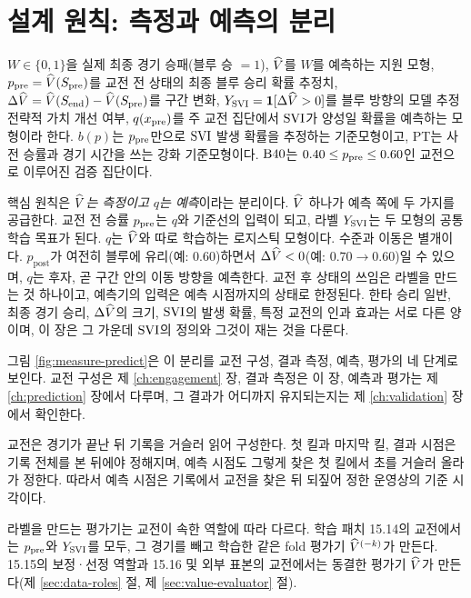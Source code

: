 \section{설계 원칙: 측정과 예측의 분리}
\label{sec:value-principle}

$W \in \{0,1\}$을 실제 최종 경기 승패(블루 승 $=1$), $\widehat V$를 $W$를 예측하는 지원 모형, $p_{\mathrm{pre}} = \widehat V(S_{\mathrm{pre}})$를 교전 전 상태의 최종 블루 승리 확률 추정치, $\Delta\widehat V = \widehat V(S_{\mathrm{end}}) - \widehat V(S_{\mathrm{pre}})$를 구간 변화, $Y_{\mathrm{SVI}} = \mathbf{1}[\Delta\widehat V > 0]$를 블루 방향의 모델 추정 전략적 가치 개선 여부, $q(x_{\mathrm{pre}})$를 주 교전 집단에서 $\mathrm{SVI}$가 양성일 확률을 예측하는 모형이라 한다. $b(p)$는 $p_{\mathrm{pre}}$만으로 $\mathrm{SVI}$ 발생 확률을 추정하는 기준모형이고, PT는 사전 승률과 경기 시간을 쓰는 강화 기준모형이다. $\mathrm{B40}$는 $0.40 \le p_{\mathrm{pre}} \le 0.60$인 교전으로 이루어진 검증 집단이다.

핵심 원칙은 \emph{$\widehat V$는 측정이고 $q$는 예측}이라는 분리이다. $\widehat V$ 하나가 예측 쪽에 두 가지를 공급한다. 교전 전 승률 $p_{\mathrm{pre}}$는 $q$와 기준선의 입력이 되고, 라벨 $Y_{\mathrm{SVI}}$는 두 모형의 공통 학습 목표가 된다. $q$는 $\widehat V$와 따로 학습하는 로지스틱 모형이다. 수준과 이동은 별개이다. $p_{\mathrm{post}}$가 여전히 블루에 유리(예: 0.60)하면서 $\Delta\widehat V < 0$(예: $0.70 \to 0.60$)일 수 있으며, $q$는 후자, 곧 구간 안의 이동 방향을 예측한다. 교전 후 상태의 쓰임은 라벨을 만드는 것 하나이고, 예측기의 입력은 예측 시점까지의 상태로 한정된다. 한타 승리 일반, 최종 경기 승리, $\Delta\widehat V$의 크기, $\mathrm{SVI}$의 발생 확률, 특정 교전의 인과 효과는 서로 다른 양이며, 이 장은 그 가운데 $\mathrm{SVI}$의 정의와 그것이 재는 것을 다룬다.

그림 \ref{fig:measure-predict}은 이 분리를 교전 구성, 결과 측정, 예측, 평가의 네 단계로 보인다. 교전 구성은 제 \ref{ch:engagement} 장, 결과 측정은 이 장, 예측과 평가는 제 \ref{ch:prediction} 장에서 다루며, 그 결과가 어디까지 유지되는지는 제 \ref{ch:validation} 장에서 확인한다.

교전은 경기가 끝난 뒤 기록을 거슬러 읽어 구성한다. 첫 킬과 마지막 킬, 결과 시점은 기록 전체를 본 뒤에야 정해지며, 예측 시점도 그렇게 찾은 첫 킬에서 \constB{}초를 거슬러 올라가 정한다. 따라서 예측 시점은 기록에서 교전을 찾은 뒤 되짚어 정한 운영상의 기준 시각이다.

라벨을 만드는 평가기는 교전이 속한 역할에 따라 다르다. 학습 패치 15.14의 교전에서는 $p_{\mathrm{pre}}$와 $Y_{\mathrm{SVI}}$를 모두, 그 경기를 빼고 학습한 같은 fold 평가기 $\widehat V^{(-k)}$가 만든다. 15.15의 보정·선정 역할과 15.16 및 외부 표본의 교전에서는 동결한 평가기 $\widehat V$가 만든다(제 \ref{sec:data-roles} 절, 제 \ref{sec:value-evaluator} 절).


